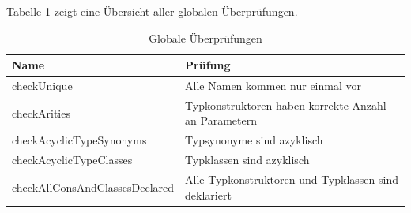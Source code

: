 %
%
%
%

Tabelle \ref{tab:global-checks} zeigt eine Übersicht aller globalen Überprüfungen.

\begin{table}[th]
\centering
\begin{tabular}{| l | l |}
\hline
Name&Prüfung\\
\hline
  checkUnique&Alle Namen kommen nur einmal vor\\
  checkArities&Typkonstruktoren haben korrekte Anzahl an Parametern\\
  checkAcyclicTypeSynonyms&Typsynonyme sind azyklisch\\
  checkAcyclicTypeClasses&Typklassen sind azyklisch\\
  checkAllConsAndClassesDeclared&Alle Typkonstruktoren und Typklassen sind deklariert\\
\hline
\end{tabular}
\caption{Globale Überprüfungen}
\label{tab:global-checks}
\end{table}

